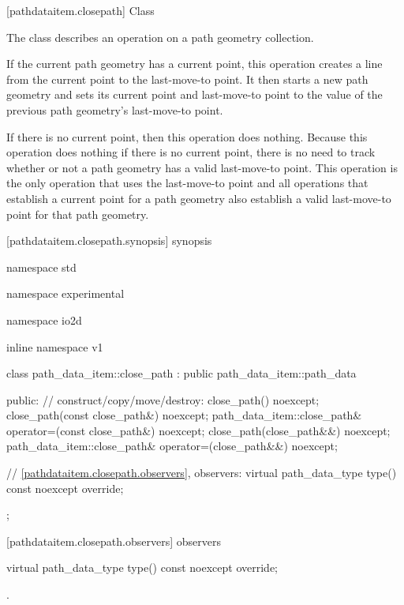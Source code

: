  [pathdataitem.closepath] {Class }

\pnum
{}
The class  describes an operation on a path geometry collection.

\pnum
If the current path geometry has a current point, this operation creates a line from the current point to the last-move-to point. It then starts a new path geometry and sets its current point and last-move-to point to the value of the previous path geometry's last-move-to point.

\pnum
If there is no current point, then this operation does nothing.
\enternote
Because this operation does nothing if there is no current point, there is no need to track whether or not a path geometry has a valid last-move-to point. This operation is the only operation that uses the last-move-to point and all operations that establish a current point for a path geometry also establish a valid last-move-to point for that path geometry.
\exitnote

 [pathdataitem.closepath.synopsis] { synopsis}

\begin{codeblock}
namespace std { namespace experimental { namespace io2d { inline namespace v1 {
  class path_data_item::close_path : public path_data_item::path_data {
  public:
    // construct/copy/move/destroy:
    close_path() noexcept;
    close_path(const close_path&) noexcept;
    path_data_item::close_path& operator=(const close_path&) noexcept;
    close_path(close_path&&) noexcept;
    path_data_item::close_path& operator=(close_path&&) noexcept;

    // \ref{pathdataitem.closepath.observers}, observers:
    virtual path_data_type type() const noexcept override;
  };
} } } }
\end{codeblock}

 [pathdataitem.closepath.observers]{ observers}

\begin{itemdecl}
    virtual path_data_type type() const noexcept override;
\end{itemdecl}
\begin{itemdescr}
	\pnum
	\returns
	.
\end{itemdescr}
